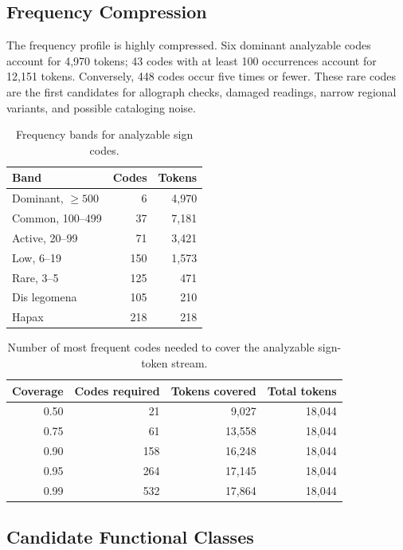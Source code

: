 \subsection{Frequency Compression}

The frequency profile is highly compressed. Six dominant analyzable codes account for 4,970 tokens; 43 codes with at least 100 occurrences account for 12,151 tokens. Conversely, 448 codes occur five times or fewer. These rare codes are the first candidates for allograph checks, damaged readings, narrow regional variants, and possible cataloging noise.

\begin{table}[htbp]
\centering
\begin{tabular}{lrr}
\toprule
\textbf{Band} & \textbf{Codes} & \textbf{Tokens} \\
\midrule
Dominant, $\geq 500$ & 6 & 4,970 \\
Common, 100--499 & 37 & 7,181 \\
Active, 20--99 & 71 & 3,421 \\
Low, 6--19 & 150 & 1,573 \\
Rare, 3--5 & 125 & 471 \\
Dis legomena & 105 & 210 \\
Hapax & 218 & 218 \\
\bottomrule
\end{tabular}
\caption{Frequency bands for analyzable sign codes.}
\label{tab:frequency-bands}
\end{table}

\begin{table}[htbp]
\centering
\begin{tabular}{rrrr}
\toprule
\textbf{Coverage} & \textbf{Codes required} & \textbf{Tokens covered} & \textbf{Total tokens} \\
\midrule
0.50 & 21 & 9,027 & 18,044 \\
0.75 & 61 & 13,558 & 18,044 \\
0.90 & 158 & 16,248 & 18,044 \\
0.95 & 264 & 17,145 & 18,044 \\
0.99 & 532 & 17,864 & 18,044 \\
\bottomrule
\end{tabular}
\caption{Number of most frequent codes needed to cover the analyzable sign-token stream.}
\label{tab:coverage-thresholds}
\end{table}

\subsection{Candidate Functional Classes}


